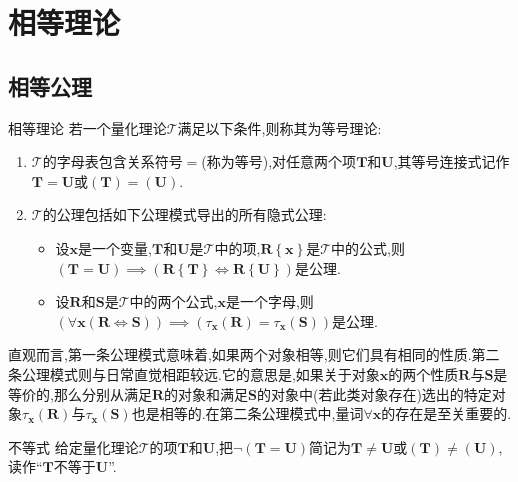 \chapter{相等理论}

\section{相等公理}

\begin{definition}{相等理论}{}
	若一个量化理论$\mathcal{T}$满足以下条件,则称其为等号理论:
	\begin{enumerate}
		\item $\mathcal{T}$的字母表包含关系符号$=$(称为等号),对任意两个项$\boldsymbol{T}$和$\boldsymbol{U}$,其等号连接式记作$\boldsymbol{T}=\boldsymbol{U}$或$\left(\boldsymbol{T}\right)=\left(\boldsymbol{U}\right)$.
		\item $\mathcal{T}$的公理包括如下公理模式导出的所有隐式公理:
		\begin{itemize}
			\item 设$\boldsymbol{x}$是一个变量,$\boldsymbol{T}$和$\boldsymbol{U}$是$\mathcal{T}$中的项,$\boldsymbol{R}\left\{\boldsymbol{x}\right\}$是$\mathcal{T}$中的公式,则$\left(\boldsymbol{T}=\boldsymbol{U}\right)\implies\left(\boldsymbol{R}\left\{\boldsymbol{T}\right\}\iff\boldsymbol{R}\left\{\boldsymbol{U}\right\}\right)$是公理.
			\item 
			设$\boldsymbol{R}$和$\boldsymbol{S}$是$\mathcal{T}$中的两个公式,$\boldsymbol{x}$是一个字母,则$\left(\forall\boldsymbol{x}\left(\boldsymbol{R}\iff\boldsymbol{S}\right)\right)\implies\left(\tau_{\boldsymbol{x}}\left(\boldsymbol{R}\right)=\tau_{\boldsymbol{x}}\left(\boldsymbol{S}\right)\right)$是公理.
		\end{itemize}
	\end{enumerate}
\end{definition}

\begin{remark}{}{}
	直观而言,第一条公理模式意味着,如果两个对象相等,则它们具有相同的性质.第二条公理模式则与日常直觉相距较远.它的意思是,如果关于对象$\boldsymbol{x}$的两个性质$\boldsymbol{R}$与$\boldsymbol{S}$是等价的,那么分别从满足$\boldsymbol{R}$的对象和满足$\boldsymbol{S}$的对象中(若此类对象存在)选出的特定对象$\tau_{\boldsymbol{x}}\left(\boldsymbol{R}\right)$与$\tau_{\boldsymbol{x}}\left(\boldsymbol{S}\right)$也是相等的.在第二条公理模式中,量词$\forall\boldsymbol{x}$的存在是至关重要的.
\end{remark}

\begin{definition}{不等式}{}
	给定量化理论$\mathcal{T}$的项$\boldsymbol{T}$和$\boldsymbol{U}$,把$\neg\left(\boldsymbol{T}=\boldsymbol{U}\right)$简记为$\boldsymbol{T}\neq\boldsymbol{U}$或$\left(\boldsymbol{T}\right)\neq\left(\boldsymbol{U}\right)$,读作``$\boldsymbol{T}$不等于$\boldsymbol{U}$''.
\end{definition}

